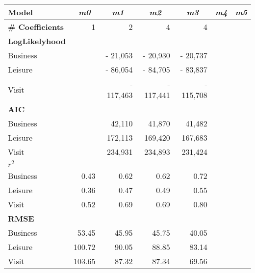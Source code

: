 \begin{tabular}{lrrrrrr}
\toprule
\textbf{Model} & \multicolumn{1}{c}{\textit{\textbf{m0}}} & \multicolumn{1}{c}{\textit{\textbf{m1}}} & \multicolumn{1}{c}{\textit{\textbf{m2}}} & \multicolumn{1}{c}{\textit{\textbf{m3}}} & \multicolumn{1}{c}{\textit{\textbf{m4}}} & \multicolumn{1}{c}{\textit{\textbf{m5}}} \\
\midrule
\textbf{\# Coefficients} & 1     & 2     & 4     & 4     &       &  \\
\midrule
\textbf{LogLikelyhood} &       &       &       &       &       &  \\
Business &       & -   21,053 & -   20,930  & -   20,737  &       &  \\
Leisure &       & -   86,054  & -   84,705  & -   83,837  &       &  \\
Visit &       & - 117,463  & - 117,441  & - 115,708  &       &  \\
\midrule
\textbf{AIC} &       &       &       &       &       &  \\
Business &       &      42,110  &      41,870  &      41,482  &       &  \\
Leisure &       &    172,113  &    169,420  &    167,683  &       &  \\
Visit &       &    234,931  &    234,893  &    231,424  &       &  \\
\midrule
\boldmath{}\textbf{$r^2$}\unboldmath{} &       &       &       &       &       &  \\
Business & 0.43  & 0.62  & 0.62  & 0.72  &       &  \\
Leisure & 0.36  & 0.47  & 0.49  & 0.55  &       &  \\
Visit & 0.52  & 0.69  & 0.69  & 0.80  &       &  \\
\midrule
\textbf{RMSE} &       &       &       &       &       &  \\
Business & 53.45 & 45.95 & 45.75 & 40.05 &       &  \\
Leisure & 100.72 & 90.05 & 88.85 & 83.14 &       &  \\
Visit & 103.65 & 87.32 & 87.34 & 69.56 &       &  \\
\bottomrule
\end{tabular}%
